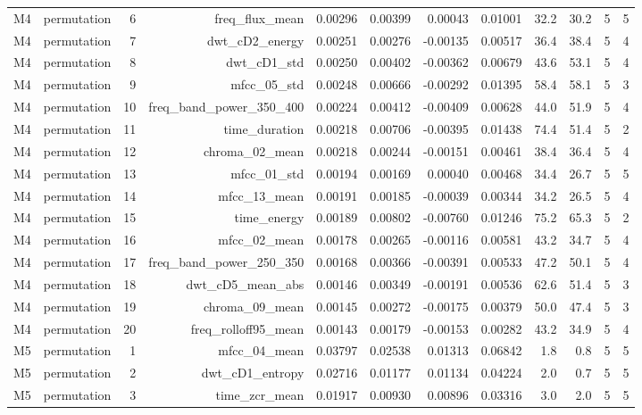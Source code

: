 \begin{table}[htbp]
\begin{tabular}{lrrrrrrrrrrr}
    M4 & permutation & 6 & freq\_flux\_mean & 0.00296 & 0.00399 & 0.00043 & 0.01001 & 32.2 & 30.2 & 5 & 5 \\
    M4 & permutation & 7 & dwt\_cD2\_energy & 0.00251 & 0.00276 & -0.00135 & 0.00517 & 36.4 & 38.4 & 5 & 4 \\
    M4 & permutation & 8 & dwt\_cD1\_std & 0.00250 & 0.00402 & -0.00362 & 0.00679 & 43.6 & 53.1 & 5 & 4 \\
    M4 & permutation & 9 & mfcc\_05\_std & 0.00248 & 0.00666 & -0.00292 & 0.01395 & 58.4 & 58.1 & 5 & 3 \\
    M4 & permutation & 10 & freq\_band\_power\_350\_400 & 0.00224 & 0.00412 & -0.00409 & 0.00628 & 44.0 & 51.9 & 5 & 4 \\
    M4 & permutation & 11 & time\_duration & 0.00218 & 0.00706 & -0.00395 & 0.01438 & 74.4 & 51.4 & 5 & 2 \\
    M4 & permutation & 12 & chroma\_02\_mean & 0.00218 & 0.00244 & -0.00151 & 0.00461 & 38.4 & 36.4 & 5 & 4 \\
    M4 & permutation & 13 & mfcc\_01\_std & 0.00194 & 0.00169 & 0.00040 & 0.00468 & 34.4 & 26.7 & 5 & 5 \\
    M4 & permutation & 14 & mfcc\_13\_mean & 0.00191 & 0.00185 & -0.00039 & 0.00344 & 34.2 & 26.5 & 5 & 4 \\
    M4 & permutation & 15 & time\_energy & 0.00189 & 0.00802 & -0.00760 & 0.01246 & 75.2 & 65.3 & 5 & 2 \\
    M4 & permutation & 16 & mfcc\_02\_mean & 0.00178 & 0.00265 & -0.00116 & 0.00581 & 43.2 & 34.7 & 5 & 4 \\
    M4 & permutation & 17 & freq\_band\_power\_250\_350 & 0.00168 & 0.00366 & -0.00391 & 0.00533 & 47.2 & 50.1 & 5 & 4 \\
    M4 & permutation & 18 & dwt\_cD5\_mean\_abs & 0.00146 & 0.00349 & -0.00191 & 0.00536 & 62.6 & 51.4 & 5 & 3 \\
    M4 & permutation & 19 & chroma\_09\_mean & 0.00145 & 0.00272 & -0.00175 & 0.00379 & 50.0 & 47.4 & 5 & 3 \\
    M4 & permutation & 20 & freq\_rolloff95\_mean & 0.00143 & 0.00179 & -0.00153 & 0.00282 & 43.2 & 34.9 & 5 & 4 \\
    M5 & permutation & 1 & mfcc\_04\_mean & 0.03797 & 0.02538 & 0.01313 & 0.06842 & 1.8 & 0.8 & 5 & 5 \\
    M5 & permutation & 2 & dwt\_cD1\_entropy & 0.02716 & 0.01177 & 0.01134 & 0.04224 & 2.0 & 0.7 & 5 & 5 \\
    M5 & permutation & 3 & time\_zcr\_mean & 0.01917 & 0.00930 & 0.00896 & 0.03316 & 3.0 & 2.0 & 5 & 5 \\

\end{tabular}
\end{table}
